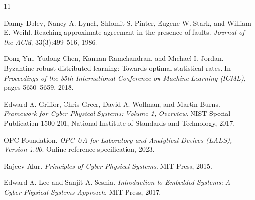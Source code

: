 \documentclass[11pt]{article}
\begin{document}
\begin{thebibliography}{11}

Danny Dolev, Nancy A. Lynch, Shlomit S. Pinter, Eugene W. Stark, and William E. Weihl.
\newblock Reaching approximate agreement in the presence of faults.
\newblock \emph{Journal of the ACM}, 33(3):499--516, 1986.

Dong Yin, Yudong Chen, Kannan Ramchandran, and Michael I. Jordan.
\newblock Byzantine-robust distributed learning: Towards optimal statistical rates.
\newblock In \emph{Proceedings of the 35th International Conference on Machine Learning (ICML)}, pages 5650--5659, 2018.

Edward A. Griffor, Chris Greer, David A. Wollman, and Martin Burns.
\newblock \emph{Framework for Cyber-Physical Systems: Volume 1, Overview}.
\newblock NIST Special Publication 1500-201, National Institute of Standards and Technology, 2017.

OPC Foundation.
\newblock \emph{OPC UA for Laboratory and Analytical Devices (LADS), Version 1.00}.
\newblock Online reference specification, 2023.

Rajeev Alur.
\newblock \emph{Principles of Cyber-Physical Systems}.
\newblock MIT Press, 2015.

Edward A. Lee and Sanjit A. Seshia.
\newblock \emph{Introduction to Embedded Systems: A Cyber-Physical Systems Approach}.
\newblock MIT Press, 2017.

\end{thebibliography}
\end{document}
